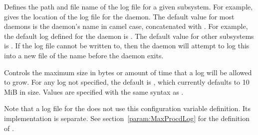 \begin{description}
  
\label{param:SubsysLog}
\item[\MacroB{<SUBSYS>\_LOG}]
  Defines the path and file name of the log file for a given subsystem.  
  For example,
   gives the location of the log file for
  the  daemon. 
  The default value for most daemons is the daemon's name in camel case,
  concatenated with .
  For example, the default log defined for the  daemon
  is .
  The default value for other subsystems is .
  If the log file cannot be written to,
  then the daemon will attempt to log this into a new file of the name
   before the daemon exits.

\label{param:MaxSubsysLog}
\item[\Macro{MAX\_<SUBSYS>\_LOG}]
  Controls the maximum size in bytes or amount of time that a
  log will be allowed to grow. 
  For any log not specified, the default is ,
  which currently defaults to 10  MiB in size.
  Values are specified with the same syntax as .

  Note that a log file for the  does not use this configuration
  variable definition. 
  Its implementation is separate.  
  See section~\ref{param:MaxProcdLog} for the definition of
  .
 

\end{description}
